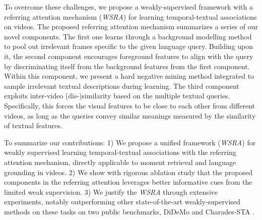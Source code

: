 


To overcome these challenges, 
we propose a weakly-supervised framework with a referring attention mechanism (\textit{WSRA})
for learning temporal-textual associations on videos.
The proposed referring attention mechanism summarizes a series of our novel components.
The first one learns through a background modelling method to pool out 
irrelevant frames specific to the given language query. 
Building upon it, 
the second component encourages foreground features to align with the query
by discriminating itself from the background features from the first component. 
Within this component, 
we present a hard negative mining method integrated to sample irrelevant textual descriptions during learning. 
The third component exploits inter-video (dis-)similarity based on 
the multiple textual queries.
Specifically,
this forces the visual features to be close to each other from different videos,
as long as the queries convey similar meanings measured by the similarity of textual features.

To summarize our  contributions:
1) We propose a unified framework (\textit{WSRA}) for weakly supervised learning temporal-textual associations with the referring attention 
mechanism,
directly applicable to moment retrieval and language grounding in videos.
2) We show with rigorous ablation study that the proposed components 
in the referring attention leverages better informative cues from  the limited weak supervision.
3) We justify the \textit{WSRA} through extensive experiments,
notably outperforming other state-of-the-art weakly-supervised methods on these
tasks on two public benchmarks, 
DiDeMo \citep{anne2017localizing} and 
Charades-STA \citep{gao2017tall}.

